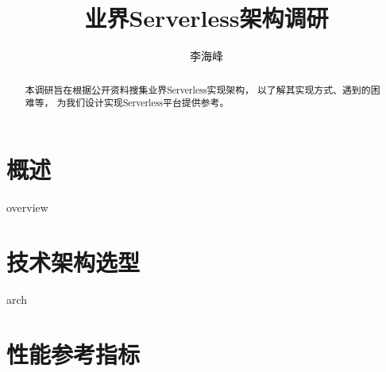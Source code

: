 \documentclass{scrartcl}
\title{业界Serverless架构调研}
\author{李海峰}
\begin{document}
\begin{titlingpage}
\maketitle
\begin{abstract}
    本调研旨在根据公开资料搜集业界Serverless实现架构，
    以了解其实现方式、遇到的困难等，
    为我们设计实现Serverless平台提供参考。
\end{abstract}
\end{titlingpage}
\tableofcontents

\section{概述}
{overview}
\section{技术架构选型}
{arch}
\section{性能参考指标}

\clearpage
\printbibliography 
\end{document}

